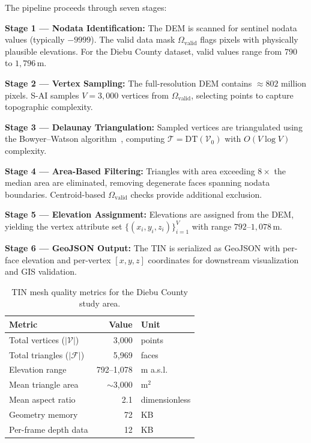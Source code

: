 \documentclass[11pt, a4paper]{article}
\begin{document}
The pipeline proceeds through seven stages:

\textbf{Stage 1 --- Nodata Identification:} The DEM is scanned for sentinel nodata values (typically $-9999$). The valid data mask $\Omega_{\text{valid}}$ flags pixels with physically plausible elevations. For the Diebu County dataset, valid values range from $790$ to $1{,}796$\,m.

\textbf{Stage 2 --- Vertex Sampling:} The full-resolution DEM contains $\approx 802$ million pixels. S-AI samples $V = 3{,}000$ vertices from $\Omega_{\text{valid}}$, selecting points to capture topographic complexity.

\textbf{Stage 3 --- Delaunay Triangulation:} Sampled vertices are triangulated using the Bowyer--Watson algorithm~\cite{delaunay,watson}, computing $\mathcal{T} = \mathrm{DT}(\mathcal{V}_0)$ with $O(V \log V)$ complexity.

\textbf{Stage 4 --- Area-Based Filtering:} Triangles with area exceeding $8\times$ the median area are eliminated, removing degenerate faces spanning nodata boundaries. Centroid-based $\Omega_{\text{valid}}$ checks provide additional exclusion.

\textbf{Stage 5 --- Elevation Assignment:} Elevations are assigned from the DEM, yielding the vertex attribute set $\{(x_i, y_i, z_i)\}_{i=1}^{V}$ with range $792$--$1{,}078$\,m.

\textbf{Stage 6 --- GeoJSON Output:} The TIN is serialized as GeoJSON with per-face elevation and per-vertex $[x, y, z]$ coordinates for downstream visualization and GIS validation.

\begin{table}[htbp]
\centering
\caption{TIN mesh quality metrics for the Diebu County study area.}
\label{tab:tin_quality}
\small
\begin{tabular}{@{}lrl@{}}
\toprule
\textbf{Metric} & \textbf{Value} & \textbf{Unit} \\
\midrule
Total vertices ($|\mathcal{V}|$) & 3,000 & points \\
Total triangles ($|\mathcal{F}|$) & 5,969 & faces \\
Elevation range & 792--1,078 & m a.s.l. \\
Mean triangle area & $\sim$3,000 & m$^2$ \\
Mean aspect ratio & 2.1 & dimensionless \\
Geometry memory & 72 & KB \\
Per-frame depth data & 12 & KB \\
\bottomrule
\end{tabular}
\end{table}
\end{document}
